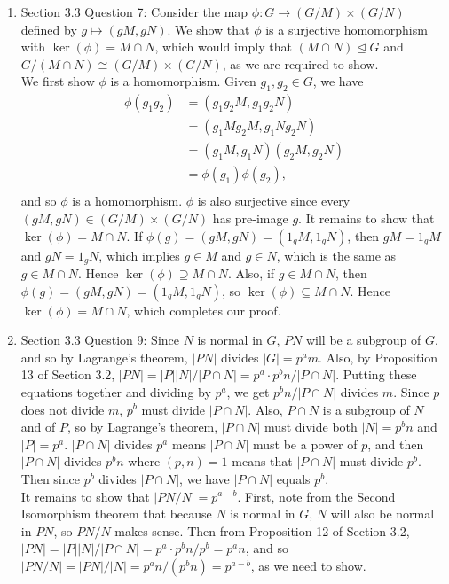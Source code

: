\documentclass{article}
\begin{document}
\begin{enumerate}
  \item Section 3.3 Question 7: Consider the map $\phi:G
    \rightarrow(G/M)\times(G/N)$ defined by $g\mapsto(gM,gN)$. We show
    that $\phi$ is a surjective homomorphism with $\ker(\phi)=M\cap N$,
    which would imply that $(M\cap N)\trianglelefteq G$ and $G/(M\cap
    N)\cong(G/M)\times(G/N)$, as we are required to show. \\

    We first show $\phi$ is a homomorphism. Given $g_1,g_2\in G$, we have
    \begin{align*}
      \phi(g_1g_2)  &= (g_1g_2M,g_1g_2N)      \\
                    &= (g_1Mg_2M,g_1Ng_2N)    \\
                    &= (g_1M,g_1N)(g_2M,g_2N) \\
                    &= \phi(g_1)\phi(g_2),    \\
    \end{align*}
    and so $\phi$ is a homomorphism. $\phi$ is also surjective since every
    $(gM,gN)\in(G/M)\times(G/N)$ has pre-image $g$. It remains to show
    that $\ker(\phi)=M\cap N$. If $\phi(g)=(gM,gN)=(1_gM,1_gN)$, then
    $gM=1_gM$ and $gN=1_gN$, which implies $g\in M$ and $g\in N$, which is
    the same as $g\in M\cap N$. Hence
    $\ker(\phi)\supseteq M\cap N$. Also, if $g\in M\cap N$, then
    $\phi(g)=(gM,gN)=(1_gM,1_gN)$, so $\ker(\phi)\subseteq M\cap N$.
    Hence $\ker(\phi)=M\cap N$, which completes our proof.

  \item Section 3.3 Question 9: Since $N$ is normal in $G$, $PN$ will be a
    subgroup of $G$, and so by Lagrange's theorem, $|PN|$ divides
    $|G|=p^am$. Also, by Proposition 13 of Section 3.2,
    $|PN|=|P||N|/|P\cap N|=p^a\cdot p^bn/|P\cap N|$. Putting these
    equations together and dividing by $p^a$, we get $p^bn/|P\cap N|$
    divides $m$. Since $p$ does not divide $m$, $p^b$ must divide $|P\cap
    N|$. Also, $P\cap N$ is a subgroup of $N$ and of $P$, so by Lagrange's
    theorem, $|P\cap N|$ must divide both $|N|=p^bn$ and $|P|=p^a$. $|P\cap
    N|$ divides $p^a$ means $|P\cap N|$ must be a power of $p$, and then
    $|P\cap N|$ divides $p^bn$ where $(p,n)=1$ means that $|P\cap N|$ must
    divide $p^b$. Then since $p^b$ divides $|P\cap N|$, we have $|P\cap N|$
    equals $p^b$. \\

    It remains to show that $|PN/N|=p^{a-b}$. First, note from the Second
    Isomorphism theorem that because $N$ is normal in $G$, $N$ will also be
    normal in $PN$, so $PN/N$ makes sense. Then from Proposition 12 of
    Section 3.2, $|PN|=|P||N|/|P\cap N|=p^a\cdot p^bn/p^b=p^an$, and so
    $|PN/N|=|PN|/|N|=p^an/(p^bn)=p^{a-b}$, as we need to show.


\end{enumerate}
\end{document}
